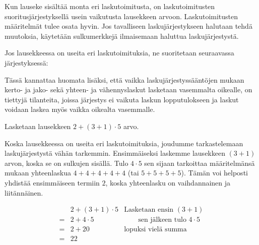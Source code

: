 Kun lauseke sisältää monta eri laskutoimitusta, on laskutoimitusten suoritusjärjestyksellä usein vaikutusta lausekkeen arvoon. Laskutoimitusten määritelmät tulee osata hyvin. Jos tavalliseen laskujärjestykseen halutaan tehdä muutoksia, käytetään sulkumerkkejä ilmaisemaan haluttua laskujärjestystä.

Jos lausekkeessa on useita eri laskutoimituksia, ne suoritetaan seuraavassa järjestyksessä:



Tässä kannattaa huomata lisäksi, että vaikka laskujärjestyssääntöjen mukaan kerto- ja jako- sekä yhteen- ja vähennyslaskut lasketaan vasemmalta oikealle, on tiettyjä tilanteita, joissa järjestys ei vaikuta laskun lopputulokseen ja laskut voidaan laskea myös vaikka oikealta vasemmalle. %

\begin{esimerkki}
Lasketaan lausekkeen $2+(3+1)\cdot 5$ arvo.

Koska lausekkeessa on useita eri laskutoimituksia, joudumme tarkastelemaan laskujärjestystä vähän tarkemmin. Ensimmäiseksi laskemme lausekkeen $(3+1)$ arvon, koska se on sulkujen sisällä. Tulo $4\cdot5$ sen sijaan tarkoittaa määritelmänsä mukaan yhteenlaskua $4+4+4+4+4$ (tai $5+5+5+5$). Tämän voi helposti yhdistää ensimmäiseen termiin $2$, koska yhteenlasku on vaihdannainen ja liitännäinen.

\begin{align*}
   &2+(3+1)\cdot 5&\textrm{Lasketaan ensin } (3+1)
\\= &2+4\cdot5&\qquad\textrm{sen jälkeen tulo } 4\cdot 5
\\= &2+20& \textrm{lopuksi vielä summa}
\\= &22&
\end{align*}
\end{esimerkki}

